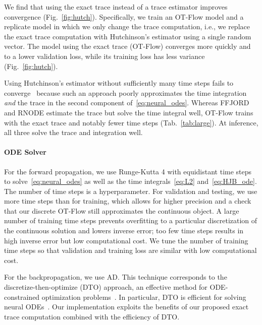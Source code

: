 \documentclass[letterpaper]{article}
\newcommand{\model}{OT-Flow} %
\begin{document}
	We find that using the exact trace instead of a trace estimator improves convergence (Fig.~\ref{fig:hutch}). Specifically, we train an \model{} model and a replicate model in which we only change the trace computation, i.e., we replace the exact trace computation with Hutchinson's estimator using a single random vector. The model using the exact trace (\model{}) converges more quickly and to a lower validation loss, while its training loss has less variance (Fig.~\ref{fig:hutch}). 
	
	Using Hutchinson's estimator without sufficiently many time steps fails to converge~\cite{onken2020do} because such an approach poorly approximates the time integration \emph{and} the trace in the second component of~\eqref{eq:neural_odes}. Whereas FFJORD and RNODE estimate the trace but solve the time integral well, \model{} trains with the exact trace and notably fewer time steps (Tab.~\ref{tab:large}). At inference, all three solve the trace and integration well.





    \paragraph{ODE Solver} For the forward propagation, we use Runge-Kutta 4 with equidistant time steps to solve~\eqref{eq:neural_odes} as well as the time integrals~\eqref{eq:L2} and~\eqref{eq:HJB_ode}. The number of time steps is a hyperparameter.
    For validation and testing, we use more time steps than for training, which allows for higher precision and a check that our discrete \model{} still approximates the continuous object.
    A large number of training time steps prevents overfitting to a particular discretization of the continuous solution and lowers inverse error; too few time steps results in high inverse error but low computational cost. 
	We tune the number of training time steps so that validation and training loss are similar with low computational cost.
    
    For the backpropagation, we use AD.    
    This technique corresponds to the discretize-then-optimize (DTO) approach, an effective method for ODE-constrained optimization problems~\cite{collis2002analysis,abraham2004effect,becker2007optimal,leugering2014trends}.
    In particular, DTO is efficient for solving neural ODEs~\cite{li2017maximum,gholami2019anode,onken2020do}. 
    Our implementation exploits the benefits of our proposed exact trace computation combined with the efficiency of DTO.
    
\end{document}
